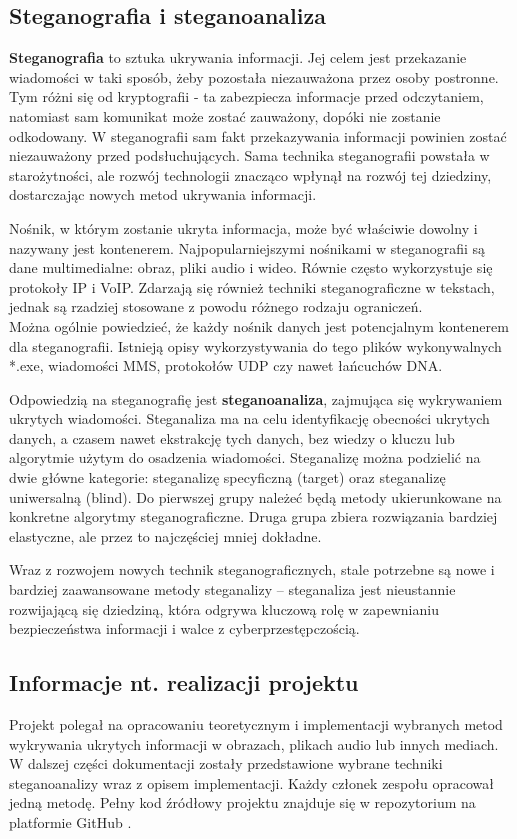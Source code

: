 \subsection{Steganografia i steganoanaliza}
\textbf{Steganografia} to sztuka ukrywania informacji. Jej celem jest przekazanie wiadomości w taki sposób, żeby 
pozostała niezauważona przez osoby postronne. Tym różni się od kryptografii - ta zabezpiecza informacje 
przed odczytaniem, natomiast sam komunikat może zostać zauważony, dopóki nie zostanie odkodowany. W 
steganografii sam fakt przekazywania informacji powinien zostać niezauważony przed podsłuchujących.
Sama technika steganografii powstała w starożytności, ale rozwój technologii znacząco wpłynął na rozwój tej 
dziedziny, dostarczając nowych metod ukrywania informacji. \cite{Johnson, khalid}

Nośnik, w którym zostanie ukryta informacja, może być właściwie dowolny i nazywany jest kontenerem. 
Najpopularniejszymi nośnikami w steganografii są dane multimedialne: obraz, pliki audio i wideo. Równie 
często wykorzystuje się protokoły IP i VoIP. Zdarzają się również techniki steganograficzne w tekstach, 
jednak są rzadziej stosowane z powodu różnego rodzaju ograniczeń.\\
Można ogólnie powiedzieć, że każdy nośnik danych jest potencjalnym kontenerem dla steganografii. 
Istnieją opisy wykorzystywania do tego plików wykonywalnych *.exe, wiadomości MMS, protokołów UDP czy nawet 
łańcuchów DNA. \cite{Kozie2014WspczesneTS}


Odpowiedzią na steganografię jest \textbf{steganoanaliza}, zajmująca się wykrywaniem ukrytych wiadomości. 
Steganaliza ma na celu identyfikację obecności ukrytych danych, a czasem nawet ekstrakcję tych danych, bez 
wiedzy o kluczu lub algorytmie użytym do osadzenia wiadomości. 
Steganalizę można podzielić na dwie główne kategorie: steganalizę specyficzną (target) oraz steganalizę 
uniwersalną (blind). Do pierwszej grupy należeć będą metody ukierunkowane na konkretne algorytmy 
steganograficzne. Druga grupa zbiera rozwiązania bardziej elastyczne, ale przez to najczęściej mniej dokładne. 

Wraz z rozwojem nowych technik steganograficznych, stale potrzebne są nowe i bardziej zaawansowane metody 
steganalizy -- steganaliza jest nieustannie rozwijającą się dziedziną, która odgrywa kluczową rolę w 
zapewnianiu bezpieczeństwa informacji i walce z cyberprzestępczością. \cite{stat_stego_study}


\subsection{Informacje nt. realizacji projektu}
Projekt polegał na opracowaniu teoretycznym i implementacji wybranych metod wykrywania ukrytych informacji 
w obrazach, plikach audio lub innych mediach.
W dalszej części dokumentacji zostały przedstawione wybrane techniki steganoanalizy wraz z opisem 
implementacji. Każdy członek zespołu opracował jedną metodę. Pełny kod źródłowy projektu znajduje się w 
repozytorium na platformie GitHub \cite{repo}.


